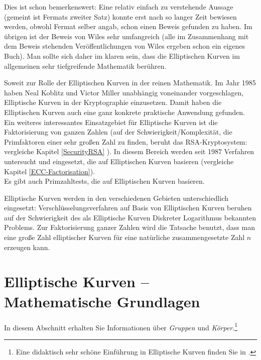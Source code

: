 \begin{refsegment}
Dies ist schon bemerkenswert: Eine relativ einfach zu verstehende Aussage
(gemeint ist Fermats zweiter Satz) konnte erst nach so langer Zeit bewiesen werden, obwohl
Fermat selber angab, schon einen Beweis gefunden zu haben.
Im übrigen ist der Beweis von Wiles sehr umfangreich (alle im Zusammenhang mit dem Beweis
stehenden Veröffentlichungen von Wiles ergeben schon ein eigenes Buch). Man sollte sich daher
im klaren sein, dass die Elliptischen Kurven im allgemeinen sehr tiefgreifende Mathematik berühren.

Soweit zur Rolle der Elliptischen Kurven in der reinen Mathematik.
Im Jahr 1985 haben Neal Koblitz und Victor Miller
 unabhängig voneinander vorgeschlagen,
Elliptische Kurven in der Kryptographie einzusetzen. Damit haben die
Elliptischen Kurven auch eine ganz konkrete praktische Anwendung gefunden.
Ein weiteres interessantes Einsatzgebiet für Elliptische Kurven ist die
Faktorisierung von ganzen Zahlen 
(auf der  Schwierigkeit/Komplexität, die Primfaktoren
einer sehr großen Zahl zu finden, beruht das RSA-Kryptosystem:
vergleiche Kapitel \ref{SecurityRSA}
).
In diesem Bereich werden seit 1987 Verfahren untersucht und eingesetzt,
die auf Elliptischen Kurven basieren
(vergleiche Kapitel \ref{ECC-Factorisation}).\\
Es gibt auch Primzahltests, die auf Elliptischen
Kurven basieren.

Elliptische Kurven werden in den verschiedenen Gebieten unterschiedlich
eingesetzt:
Verschlüsselungsverfahren auf Basis von Elliptischen Kurven beruhen auf der
Schwierigkeit des als Elliptische Kurven Diskreter Logarithmus bekannten
Problems.
Zur Faktorisierung ganzer Zahlen wird die Tatsache benutzt, dass man eine
große Zahl elliptischer Kurven für eine natürliche zusammengesetzte Zahl $n$
erzeugen kann.



\section{Elliptische Kurven -- Mathematische Grundlagen}

In diesem Abschnitt erhalten Sie Informationen über
 {\em Gruppen} und  {\em Körper}.\footnote{%
  Eine didaktisch sehr schöne Einführung in Elliptische Kurven finden Sie
  in \cite{Schulz2015}.
}



\end{refsegment}
